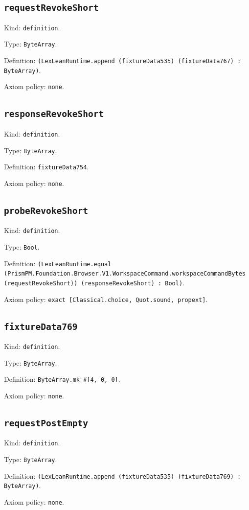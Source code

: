 \documentclass[11pt]{article}
\begin{document}
\subsection*{\texttt{requestRevokeShort}}
\noindent Kind: \texttt{definition}.\par
\noindent Type: \texttt{ByteArray}.\par
\noindent Definition: \texttt{(LexLeanRuntime.append (fixtureData535) (fixtureData767) : ByteArray)}.\par
\noindent Axiom policy: \texttt{none}.\par
\subsection*{\texttt{responseRevokeShort}}
\noindent Kind: \texttt{definition}.\par
\noindent Type: \texttt{ByteArray}.\par
\noindent Definition: \texttt{fixtureData754}.\par
\noindent Axiom policy: \texttt{none}.\par
\subsection*{\texttt{probeRevokeShort}}
\noindent Kind: \texttt{definition}.\par
\noindent Type: \texttt{Bool}.\par
\noindent Definition: \texttt{(LexLeanRuntime.equal (PrismPM.Foundation.Browser.V1.WorkspaceCommand.workspaceCommandBytes (requestRevokeShort)) (responseRevokeShort) : Bool)}.\par
\noindent Axiom policy: \texttt{exact [Classical.choice, Quot.sound, propext]}.\par
\subsection*{\texttt{fixtureData769}}
\noindent Kind: \texttt{definition}.\par
\noindent Type: \texttt{ByteArray}.\par
\noindent Definition: \texttt{ByteArray.mk \#[4, 0, 0]}.\par
\noindent Axiom policy: \texttt{none}.\par
\subsection*{\texttt{requestPostEmpty}}
\noindent Kind: \texttt{definition}.\par
\noindent Type: \texttt{ByteArray}.\par
\noindent Definition: \texttt{(LexLeanRuntime.append (fixtureData535) (fixtureData769) : ByteArray)}.\par
\noindent Axiom policy: \texttt{none}.\par
\end{document}

